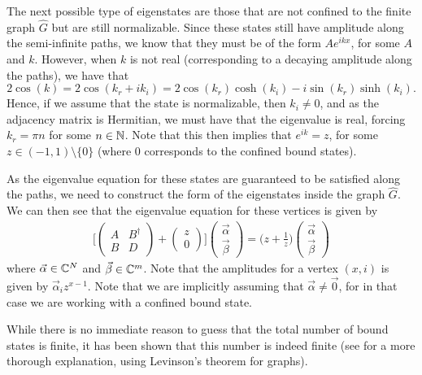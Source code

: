 \documentclass[../thesis-main/thesis-main]{subfiles}
\begin{document}
The next possible type of eigenstates are those that are not confined to the finite graph $\widehat{G}$ but are still normalizable.  Since these states still have amplitude along the semi-infinite paths, we know that they must be of the form $Ae^{i k x}$, for some $A$ and $k$.  However, when $k$ is not real (corresponding to a decaying amplitude along the paths), we have that
\begin{equation}
  2 \cos(k) = 2\cos(k_r + i k_i) = 2 \cos(k_r) \cosh(k_i) - i \sin(k_r) \sinh(k_i).
\end{equation}
Hence, if we assume that the state is normalizable, then $k_i \neq 0$, and as the adjacency matrix is Hermitian, we must have that the eigenvalue is real, forcing $k_r = \pi n$ for some $n\in \mathbb{N}$.  Note that this then implies that $e^{i k} = z$, for some $z\in(-1,1)\setminus\{0\}$ (where $0$ corresponds to the confined bound states).

As the eigenvalue equation for these states are guaranteed to be satisfied along the paths, we need to construct the form of the eigenstates inside the graph $\widehat{G}$.  We can then see that the eigenvalue equation for these vertices is given by
\begin{align}
\bigg[
  \begin{pmatrix} 
    A & B^\dag\\
    B & D
  \end{pmatrix}
  + \begin{pmatrix} 
    z \\
    0
  \end{pmatrix}
  \bigg] \begin{pmatrix}
    \vec{\alpha}\\
    \vec{\beta}
  \end{pmatrix} = \Big(z + \frac{1}{z}\Big) \begin{pmatrix} 
    \vec{\alpha}\\
    \vec{\beta}
  \end{pmatrix}
\end{align}
where $\vec{\alpha} \in \mathbb{C}^N$ and $\vec{\beta}\in \mathbb{C}^m$.  Note that the amplitudes for a vertex $(x,i)$ is given by $\vec{\alpha}_i z^{x-1}$.  Note that we are implicitly assuming that $\vec{\alpha} \neq \vec{0}$, for in that case we are working with a confined bound state.  

While there is no immediate reason to guess that the total number of bound states is finite, it has been shown that this number is indeed finite (see \cite{CG12} for a more thorough explanation, using Levinson's theorem for graphs).
\end{document}
